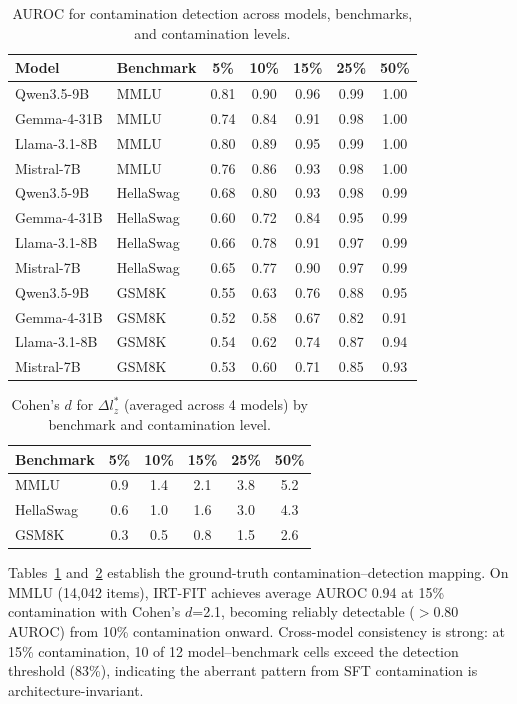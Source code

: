 \documentclass[11pt,a4paper]{article}
\begin{document}
\begin{table}[t]
\centering
\caption{AUROC for contamination detection across models, benchmarks, and contamination levels.}
\label{tab:auroc_full}
\small
\begin{tabular}{llccccc}
\toprule
Model & Benchmark & 5\% & 10\% & 15\% & 25\% & 50\% \\
\midrule
Qwen3.5-9B & MMLU & 0.81 & 0.90 & 0.96 & 0.99 & 1.00 \\
Gemma-4-31B & MMLU & 0.74 & 0.84 & 0.91 & 0.98 & 1.00 \\
Llama-3.1-8B & MMLU & 0.80 & 0.89 & 0.95 & 0.99 & 1.00 \\
Mistral-7B & MMLU & 0.76 & 0.86 & 0.93 & 0.98 & 1.00 \\
\midrule
Qwen3.5-9B & HellaSwag & 0.68 & 0.80 & 0.93 & 0.98 & 0.99 \\
Gemma-4-31B & HellaSwag & 0.60 & 0.72 & 0.84 & 0.95 & 0.99 \\
Llama-3.1-8B & HellaSwag & 0.66 & 0.78 & 0.91 & 0.97 & 0.99 \\
Mistral-7B & HellaSwag & 0.65 & 0.77 & 0.90 & 0.97 & 0.99 \\
\midrule
Qwen3.5-9B & GSM8K & 0.55 & 0.63 & 0.76 & 0.88 & 0.95 \\
Gemma-4-31B & GSM8K & 0.52 & 0.58 & 0.67 & 0.82 & 0.91 \\
Llama-3.1-8B & GSM8K & 0.54 & 0.62 & 0.74 & 0.87 & 0.94 \\
Mistral-7B & GSM8K & 0.53 & 0.60 & 0.71 & 0.85 & 0.93 \\
\bottomrule
\end{tabular}
\end{table}

\begin{table}[t]
\centering
\caption{Cohen's $d$ for $\Delta l_{z}^{*}$ (averaged across 4 models) by benchmark and contamination level.}
\label{tab:cohend}
\begin{tabular}{lccccc}
\toprule
Benchmark & 5\% & 10\% & 15\% & 25\% & 50\% \\
\midrule
MMLU & 0.9 & 1.4 & 2.1 & 3.8 & 5.2 \\
HellaSwag & 0.6 & 1.0 & 1.6 & 3.0 & 4.3 \\
GSM8K & 0.3 & 0.5 & 0.8 & 1.5 & 2.6 \\
\bottomrule
\end{tabular}
\end{table}

Tables~\ref{tab:auroc_full} and~\ref{tab:cohend} establish the ground-truth contamination--detection mapping.
On MMLU (14,042 items), IRT-FIT achieves average AUROC 0.94 at 15\% contamination with Cohen's $d$=2.1, becoming reliably detectable ($>$0.80 AUROC) from 10\% contamination onward.
Cross-model consistency is strong: at 15\% contamination, 10 of 12 model--benchmark cells exceed the detection threshold (83\%), indicating the aberrant pattern from SFT contamination is architecture-invariant.
\end{document}

